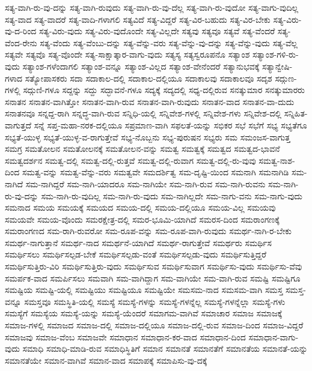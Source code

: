 {ಸತ್ಯ-ವಾಗಿ-ರು-ವು-ದನ್ನು
ಸತ್ಯ-ವಾಗಿ-ರುವುದು
ಸತ್ಯ-ವಾಗಿ-ರು-ವು-ದೆಲ್ಲ
ಸತ್ಯ-ವಾಗಿ-ರು-ವುದೋ
ಸತ್ಯ-ವಾಗು-ವುದಿಲ್ಲ
ಸತ್ಯ-ವಾದ
ಸತ್ಯ-ವಾದರೆ
ಸತ್ಯ-ವಾದಿ-ಗಳಾಗಲಿ
ಸತ್ಯವಿದೆ
ಸತ್ಯ-ವಿದ್ದರೆ
ಸತ್ಯ-ವಿರ-ಬಹುದು
ಸತ್ಯ-ವಿರ-ಬೇಕು
ಸತ್ಯ-ವಿರು-ವು-ದ-ರಿಂದ
ಸತ್ಯ-ವಿರು-ವುದು
ಸತ್ಯ-ವಿರು-ವುದೊಂದೇ
ಸತ್ಯ-ವಿಲ್ಲದೇ
ಸತ್ಯವು
ಸತ್ಯವೂ
ಸತ್ಯವೆ
ಸತ್ಯ-ವೆಂದರೆ
ಸತ್ಯ-ವೆಂದ-ರೇನು
ಸತ್ಯ-ವೆಂದು
ಸತ್ಯ-ವೆಂಬು-ದನ್ನು
ಸತ್ಯ-ವೆನ್ನು-ವರು
ಸತ್ಯ-ವೆನ್ನು-ವು-ದನ್ನು
ಸತ್ಯ-ವೆನ್ನು-ವುದು
ಸತ್ಯ-ವೆಲ್ಲ
ಸತ್ಯವೇ
ಸತ್ಯವೊ
ಸತ್ಯ-ವೊಂದೇ
ಸತ್ಯ-ಸಾಕ್ಷಾತ್ಕಾರ-ವಾಗು-ವುದು
ಸತ್ಯಸ್ಯ
ಸತ್ಯಸ್ವರೂಪನೊ
ಸತ್ಯಾಂಶ
ಸತ್ಯಾಂಶ-ಗಳಿ-ರು-ವುದು
ಸತ್ಯಾಂಶ-ಗಳೆಂದಾಗಲಿ
ಸತ್ಯಾಂಶ-ವನ್ನೂ
ಸತ್ಯಾಂಶ-ವಿಲ್ಲದ
ಸತ್ಯಾಂಶ-ವೇನೆಂದರೆ
ಸತ್ಯಾನುಭವಕ್ಕೆ
ಸತ್ಯಾನ್ವೇಷಿ-ಗಳಾದ
ಸತ್ಯೋಪಾಸಕರು
ಸದಾ
ಸದಾಕಾಲ-ದಲ್ಲಿ
ಸದಾಕಾಲ-ದಲ್ಲಿಯೂ
ಸದಾಕಾಲವು
ಸದಾಕಾಲವೂ
ಸದೃಶ
ಸದ್ಗುಣ-ಗಳಲ್ಲಿ
ಸದ್ಗುಣಿ-ಗಳೂ
ಸದ್ದನ್ನು
ಸದ್ದು
ಸದ್ಭಾವನೆ-ಗಳೂ
ಸದ್ಯಕ್ಕೆ
ಸದ್ಯದಲ್ಲಿ
ಸಧ್ಯ-ದಲ್ಲಿರುವ
ಸನತ್ಕುಮಾರ
ಸನತ್ಕುಮಾರರು
ಸನಾತನ
ಸನಾತನ-ವಾಗಿತ್ತೋ
ಸನಾತನ-ವಾಗಿ-ರುವ
ಸನಾತನ-ವಾಗಿ-ರುವುದು
ಸನಾತನ-ವಾದ
ಸನಾತನ-ವಾ-ದುದು
ಸನಾತನವೂ
ಸನ್ನದ್ದ-ರಾಗಿ
ಸನ್ನದ್ಧ-ವಾಗಿ-ರುವ
ಸನ್ನಿಧಿ-ಯಲ್ಲಿ
ಸನ್ನಿವೇಶ-ಗಳಲ್ಲಿ
ಸನ್ನಿವೇಶ-ಗಳು
ಸನ್ನಿವೇಶ-ದಲ್ಲಿ
ಸನ್ನಿಹಿತ-ವಾಗುತ್ತದೆ
ಸನ್ನೆ
ಸಪ್ತ-ಮಹಾ-ನರಕ-ದಲ್ಲಿಯೂ
ಸಪ್ರಮಾಣ-ವಾಗಿ
ಸಫಲತೆ-ಯನ್ನು
ಸಭಿಕರ
ಸಭೆ
ಸಭೆಗೆ
ಸಭ್ಯ
ಸಭ್ಯತೆಗೂ
ಸಭ್ಯತೆ-ಯುಳ್ಳ
ಸಭ್ಯತೆ-ಯುಳ್ಳ-ವ-ರಾಗುತ್ತೇವೆ
ಸಭ್ಯ-ನೊಬ್ಬನು
ಸಭ್ಯ-ಪುರುಷನ
ಸಭ್ಯರು
ಸಮ
ಸಮಂಜಸ-ವಾಗುತ್ತ
ಸಮಗ್ರ
ಸಮತೋಲನ
ಸಮತೋಲನಕ್ಕೆ
ಸಮತೋಲನ-ವನ್ನು
ಸಮತ್ವ
ಸಮತ್ವಕ್ಕೆ
ಸಮತ್ವದ
ಸಮತ್ವದ-ಭಾವನೆ
ಸಮತ್ವದರ್ಶನ
ಸಮತ್ವ-ದಲ್ಲಿ
ಸಮತ್ವ-ದಲ್ಲಿ-ರುತ್ತವೆ
ಸಮತ್ವ-ದಲ್ಲಿ-ರುವಾಗ
ಸಮತ್ವ-ದಲ್ಲಿ-ರು-ವುವು
ಸಮತ್ವ-ನಾಶ-ದಿಂದ
ಸಮತ್ವ-ವನ್ನು
ಸಮತ್ವ-ವೆನ್ನು-ವರು
ಸಮತ್ವವೇ
ಸಮದರ್ಶಿತ್ವ
ಸಮ-ದೃಷ್ಟಿ-ಯಿಂದ
ಸಮನಾಗಿ
ಸಮನಾಗಿಡಿ
ಸಮ-ನಾಗಿದೆ
ಸಮ-ನಾಗಿದ್ದರೆ
ಸಮ-ನಾಗಿ-ಯಾದರೂ
ಸಮ-ನಾಗಿಯೇ
ಸಮ-ನಾಗಿ-ರುವ
ಸಮ-ನಾಗಿ-ರುವನು
ಸಮ-ನಾಗಿ-ರು-ವು-ದನ್ನು
ಸಮ-ನಾಗಿ-ರು-ವುದಿಲ್ಲ
ಸಮ-ನಾಗಿ-ರು-ವುದು
ಸಮ-ನಾಗಿಲ್ಲದೇ
ಸಮ-ನಾಗು-ವನು
ಸಮ-ನಾಗು-ವುದು
ಸಮನಾದ
ಸಮಯ
ಸಮಯಕ್ಕೆ
ಸಮಯದ
ಸಮಯ-ದಲ್ಲಿ
ಸಮಯ-ದಲ್ಲಿಯೂ
ಸಮಯ-ವಿಲ್ಲ
ಸಮಯವು
ಸಮಯವೇ
ಸಮಯ-ವೊಂದು
ಸಮರಕ್ಷೇತ್ರ-ದಲ್ಲಿ
ಸಮರ-ಭೂಮಿ-ಯಾಗಿದೆ
ಸಮರಸ-ದಿಂದ
ಸಮರಾಂಗಣಕ್ಕೆ
ಸಮರಾಂಗಣದ
ಸಮ-ರಾಗಿ-ರುವರೋ
ಸಮ-ರೂಪ-ವನ್ನು
ಸಮ-ರೂಪ-ವಾಗಿ-ರುವುದು
ಸಮರ್ಥ-ನಾಗಿ-ರ-ಬೇಕು
ಸಮರ್ಥ-ನಾಗುತ್ತಾನೆ
ಸಮರ್ಥ-ನಾದ
ಸಮರ್ಥನೆ-ಯಾಗಿದೆ
ಸಮರ್ಥ-ರಾಗುತ್ತೇವೆ
ಸಮರ್ಥರು
ಸಮರ್ಥಿಸ
ಸಮರ್ಥಿಸಲು
ಸಮರ್ಥಿಸಲ್ಪಡ-ಬೇಕೆ
ಸಮರ್ಥಿಸಲ್ಪಡು-ವಂತೆ
ಸಮರ್ಥಿಸಲ್ಪಡು-ವುದು
ಸಮರ್ಥಿಸುತ್ತಿದ್ದರೆ
ಸಮರ್ಥಿಸುತ್ತಿರು-ವಿರಿ
ಸಮರ್ಥಿಸುತ್ತಿರು-ವುದು
ಸಮರ್ಥಿಸುವ
ಸಮರ್ಥಿಸುವಾಗ
ಸಮರ್ಥಿಸು-ವುದು
ಸಮರ್ಥಿಸು-ವೆವು
ಸಮರ್ಪಕ-ವಾದ
ಸಮರ್ಪಿಸಲು
ಸಮವಾಗಿ
ಸಮ-ವಾಗಿದ್ದಾಗ
ಸಮ-ವಾಗಿಯೇ
ಸಮ-ವಾಗಿ-ರುವ
ಸಮಷ್ಟಿ
ಸಮಷ್ಟಿಗೂ
ಸಮಷ್ಟಿಯ
ಸಮಷ್ಟಿ-ಯಲ್ಲಿ
ಸಮಷ್ಟಿಯು
ಸಮಷ್ಟಿಯೂ
ಸಮಷ್ಟಿಯೇ
ಸಮಸಮ-ನಾದ
ಸಮಸಮ-ವಾಗಿ
ಸಮಸ್ತ
ಸಮಸ್ತ-ವನ್ನೂ
ಸಮಸ್ತವೂ
ಸಮಸ್ಥಿತಿ-ಯಲ್ಲಿ
ಸಮಸ್ಯೆ
ಸಮಸ್ಯೆ-ಗಳನ್ನು
ಸಮಸ್ಯೆ-ಗಳನ್ನೆಲ್ಲ
ಸಮಸ್ಯೆ-ಗಳನ್ನೆಲ್ಲಾ
ಸಮಸ್ಯೆ-ಗಳು
ಸಮಸ್ಯೆಗೆ
ಸಮಸ್ಯೆಯ
ಸಮಸ್ಯೆ-ಯನ್ನು
ಸಮಸ್ಯೆ-ಯೆಂದರೆ
ಸಮಾಗಮ-ವಾಗಿವೆ
ಸಮಾಚಾರ
ಸಮಾಜ
ಸಮಾಜಕ್ಕೆ
ಸಮಾಜ-ಗಳಲ್ಲಿ
ಸಮಾಜದ
ಸಮಾಜ-ದಲ್ಲಿ
ಸಮಾಜ-ದಲ್ಲಿಯೂ
ಸಮಾಜ-ದಲ್ಲಿ-ರುವ
ಸಮಾಜ-ದಿಂದ
ಸಮಾಜ-ವಿದ್ದರೆ
ಸಮಾಜವು
ಸಮಾಜ-ವೆಂಬ
ಸಮಾಜವೇ
ಸಮಾಧಾನ
ಸಮಾಧಾನ-ಕರ-ವಾದ
ಸಮಾಧಾನ-ದಿಂದ
ಸಮಾಧಾನ-ವಾಗು-ವುದು
ಸಮಾಧಿ
ಸಮಾಧಿ-ಮಾಡಿ-ರುವ
ಸಮಾಧಿಸ್ಥಿತಿಗೆ
ಸಮಾನ
ಸಮಾನತೆ
ಸಮಾನತೆಗೆ
ಸಮಾನತೆಯ
ಸಮಾನತೆ-ಯನ್ನು
ಸಮಾನತೆಯೇ
ಸಮಾನ-ವಾಗಿವೆ
ಸಮಾನ-ವಾದ
ಸಮಾಪಕ್ಕೆ
ಸಮಾಪಿಸು-ವು-ದಕ್ಕೆ
}
